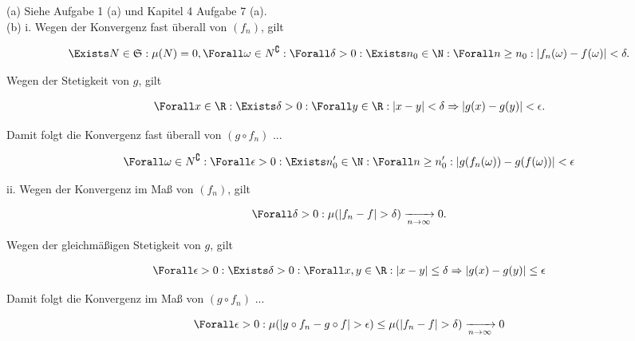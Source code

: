 \begin{solution}

(a) Siehe Aufgabe 1 (a) und Kapitel 4 Aufgabe 7 (a). \\

(b) i. Wegen der Konvergenz fast überall von $(f_n)$, gilt

\begin{align*}
  \Exists N \in \mathfrak{S}:
  \mu(N) = 0,
  \Forall \omega \in N^\complement:
  \Forall \delta > 0:
  \Exists n_0 \in \N:
  \Forall n \geq n_0:
  |f_n(\omega) - f(\omega)| < \delta.
\end{align*}

Wegen der Stetigkeit von $g$, gilt

\begin{align*}
  \Forall x \in \R:
  \Exists \delta > 0:
  \Forall y \in \R:
  |x - y| < \delta
  \Rightarrow
  |g(x) - g(y)| < \epsilon.
\end{align*}

Damit folgt die Konvergenz fast überall von $(g \circ f_n)$ ...

\begin{align*}
  \Forall \omega \in N^\complement:
  \Forall \epsilon > 0:
  \Exists n_0^\prime \in \N:
  \Forall n \geq n_0^\prime:
  |g(f_n(\omega)) - g(f(\omega))| < \epsilon
\end{align*}

ii. Wegen der Konvergenz im Maß von $(f_n)$, gilt

\begin{align*}
  \Forall \delta > 0:
  \mu(|f_n - f| > \delta)
  \xrightarrow[n \to \infty]{} 0.
\end{align*}

Wegen der gleichmäßigen Stetigkeit von $g$, gilt

\begin{align*}
  \Forall \epsilon > 0:
  \Exists \delta > 0:
  \Forall x, y \in \R:
  |x - y| \leq \delta
  \Rightarrow
  |g(x) - g(y)| \leq \epsilon
\end{align*}

Damit folgt die Konvergenz im Maß von $(g \circ f_n)$ ...

\begin{align*}
  \Forall \epsilon > 0:
  \mu(|g \circ f_n - g \circ f| > \epsilon)
  \leq
  \mu(|f_n - f| > \delta)
  \xrightarrow[n \to \infty]{} 0
\end{align*}

\end{solution}
